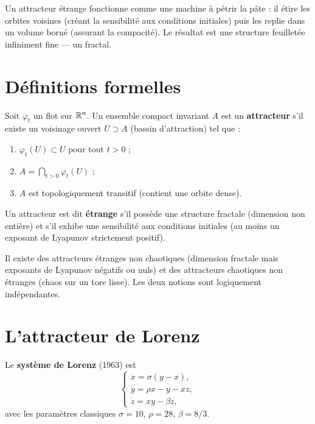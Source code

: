 \begin{intuition}
Un attracteur \'etrange fonctionne comme une machine \`a p\'etrir la p\^ate :
il \'etire les orbites voisines (cr\'eant la sensibilit\'e aux conditions
initiales) puis les replie dans un volume born\'e (assurant la compacit\'e).
Le r\'esultat est une structure feuillet\'ee infiniment fine --- un fractal.
\end{intuition}

\section{D\'efinitions formelles}

\begin{definition}[Attracteur]
Soit $\varphi_t$ un flot sur $\mathbb{R}^n$. Un ensemble compact invariant $A$ est
un \textbf{attracteur} s'il existe un voisinage ouvert $U \supset A$ (bassin
d'attraction) tel que :
\begin{enumerate}
    \item $\varphi_t(U) \subset U$ pour tout $t > 0$ ;
    \item $A = \bigcap_{t > 0} \varphi_t(U)$ ;
    \item $A$ est topologiquement transitif (contient une orbite dense).
\end{enumerate}
\end{definition}

\begin{definition}
Un attracteur est dit \textbf{\'etrange}
s'il poss\`ede une structure fractale (dimension non enti\`ere) et s'il
exhibe une sensibilit\'e aux conditions initiales (au moins un exposant
de Lyapunov strictement positif).
\end{definition}

\begin{attention}[title=\textbf{\'Etrange $\neq$ chaotique}]
Il existe des attracteurs \'etranges non chaotiques (dimension fractale mais
exposants de Lyapunov n\'egatifs ou nuls) et des attracteurs chaotiques non
\'etranges (chaos sur un tore lisse). Les deux notions sont logiquement
ind\'ependantes.
\end{attention}

\section{L'attracteur de Lorenz}

\begin{definition}
Le \textbf{syst\`eme de Lorenz} (1963) est
\[
    \begin{cases}
    \dot{x} = \sigma(y - x), \\
    \dot{y} = \rho x - y - xz, \\
    \dot{z} = xy - \beta z,
    \end{cases}
\]
avec les param\`etres classiques $\sigma = 10$, $\rho = 28$, $\beta = 8/3$.
\end{definition}

